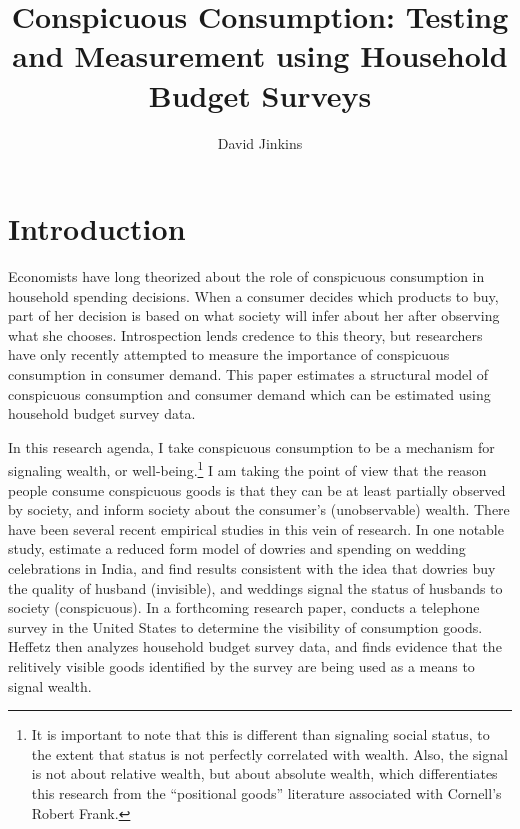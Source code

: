 \documentclass{article}
\title{Conspicuous Consumption: Testing and Measurement using Household Budget
Surveys}
\author{David Jinkins}
\begin{document}
\maketitle

\section{Introduction}
Economists have long theorized about the role of conspicuous consumption in household spending decisions.  When a consumer decides which products to buy, part of her decision is based on what society will infer about her after observing what she chooses.  Introspection lends credence to this theory, but researchers have only recently attempted to measure the importance of conspicuous consumption in consumer demand.  
This paper estimates a structural model of conspicuous consumption and consumer demand which can be estimated using household budget survey data.  

In this research agenda, I take conspicuous consumption to be a mechanism for signaling wealth, or well-being.\footnote{It is important to note that this is different than signaling social status, to the extent that status is not perfectly correlated with wealth.  Also, the signal is not about relative wealth, but about absolute wealth, which differentiates this research from the ``positional goods'' literature associated with Cornell's Robert Frank.}  I am taking the point of view that the reason people consume conspicuous goods is that they can be at least partially observed by society, and inform society about the consumer's (unobservable) wealth.  There have been several recent empirical studies in this vein of research.  In one notable study, \citet{Blochetal2004} estimate a reduced form model of dowries and spending on wedding celebrations in India, and find results consistent with the idea that dowries buy the quality of husband (invisible), and weddings signal the status of husbands to society (conspicuous).  In a forthcoming research paper, \citet{Heffetz2011} conducts a telephone survey in the United States to determine the visibility of consumption goods.  Heffetz then analyzes household budget survey data, and finds evidence that the relitively visible goods identified by the survey are being used as a means to signal wealth. 
\end{document}
